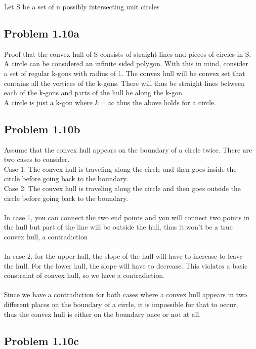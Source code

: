 \documentclass[11pt,psfig]{article}
\begin{document}
Let S be a set of n possibly intersecting unit circles

\subsection*{Problem 1.10a}

Proof that the convex hull of S consists of straight lines and pieces of circles in S. 
\\
A circle can be considered an infinite sided polygon. With this in mind, consider a set of regular k-gons with radius of 1. The convex hull will be convex set that contains all the vertices of the k-gons. There will thus be straight lines between each of the k-gons and parts of the hull be along the k-gon. 
\\
A circle is just a k-gon where $k=\infty$ thus the above holds for a circle. 

\subsection*{Problem 1.10b}

Assume that the convex hull appears on the boundary of a circle twice. There are two cases to consider.\\
Case 1: The convex hull is traveling along the circle and then goes inside the circle before going back to the boundary. \\
Case 2: The convex hull is traveling along the circle and then goes outside the circle before going back to the boundary.\\
\\
In case 1, you can connect the two end points and you will connect two points in the hull but part of the line will be outside the hull, thus it won't be a true convex hull, a contradiction\\
\\
In case 2, for the upper hull, the slope of the hull will have to increase to leave the hull. For the lower hull, the slope will have to decrease. This violates a basic constraint of convex hull, so we have a contradiction. \\
\\
Since we have a contradiction for both cases where a convex hull appears in two different places on the boundary of a circle, it is impossible for that to occur, thus the convex hull is either on the boundary once or not at all. 

\subsection*{Problem 1.10c}
\end{document}
